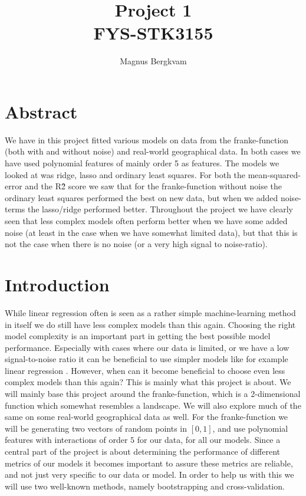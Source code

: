 \documentclass{article}
\author{Magnus Bergkvam}
\title{Project 1 \\ FYS-STK3155}
\begin{document}
\maketitle


\section{Abstract}
We have in this project fitted various models on data from the franke-function
(both with and without noise) and real-world geographical data. In both cases we
have used polynomial features of mainly order 5 as features.  The models we
looked at was ridge, lasso and ordinary least squares.  For both the
mean-squared-error and the R\^2 score we saw that for the franke-function
without noise the ordinary least squares performed the best on new data, but
when we added noise-terms the lasso/ridge performed better.  Throughout the
project we have clearly seen that less complex models often perform better when
we have some added noise (at least in the case when we have somewhat limited
data), but that this is not the case when there is no noise (or a very high
signal to noise-ratio).

\section{Introduction}
While linear regression often is seen as a rather simple machine-learning method
in itself we do still have less complex models than this again. Choosing the
right model complexity is an important part in getting the best possible model
performance. Especially with cases where our data is limited, or we have a low
signal-to-noise ratio it can be beneficial to use simpler models like for
example linear regression \cite{hastie2009elements}. However, when can it become beneficial to
choose even less complex models than this again? This is mainly what this
project is about. We will mainly base this project around the franke-function,
which is a 2-dimensional function which somewhat resembles a landscape. We will
also explore much of the same on some real-world geographical data as well. For
the franke-function we will be generating two vectors of random points in
$\left[ 0, 1 \right]$, and use polynomial features with interactions of order
$5$ for our data, for all our models. Since a central part of the project is
about determining the performance of different metrics of our models it becomes
important to assure these metrics are reliable, and not just very specific to
our data or model. In order to help us with this we will use two well-known
methods, namely bootstrapping and cross-validation. \\
\end{document}
